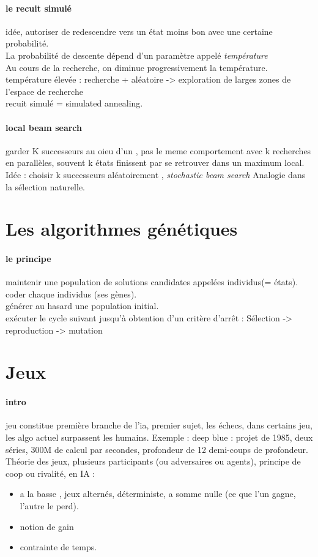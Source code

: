 \documentclass{article}
\begin{document}
\paragraph{le recuit simulé} idée, autoriser de redescendre vers un état moins bon avec une certaine probabilité.\\ La probabilité de descente dépend d'un paramètre appelé \textit{température} \\Au cours de la recherche, on diminue progressivement la température.\\température élevée : recherche + aléatoire -> exploration de larges zones de l'espace de recherche\\recuit simulé = simulated annealing.

\paragraph{local beam search} garder K successeurs au oieu d'un , pas le meme comportement avec k recherches en parallèles, souvent k états finissent par se retrouver dans un maximum local. Idée : choisir k successeurs aléatoirement , \textit{stochastic beam search} Analogie dans la sélection naturelle. 

\section{Les algorithmes génétiques} 
\paragraph{le principe} maintenir une population de solutions candidates appelées individus(= états).\\coder chaque individus (ses gènes).\\générer au hasard une population initial.\\exécuter le cycle suivant jusqu’à obtention d'un critère d’arrêt : Sélection -> reproduction -> mutation

\section{Jeux}
\paragraph{intro} jeu constitue première branche de l'ia, premier sujet, les échecs, dans certains jeu, les algo actuel surpassent les humains. Exemple : deep blue : projet de 1985, deux séries, 300M de calcul par secondes, profondeur de 12 demi-coups de profondeur. Théorie des jeux, plusieurs participants (ou adversaires ou agents), principe de coop ou rivalité, en IA  : 
\begin{itemize}
\item a la basse , jeux alternés, déterministe, a somme nulle (ce que l'un gagne, l'autre le perd).
\item notion de gain 
\item contrainte de temps.
\end{itemize}
\end{document}
